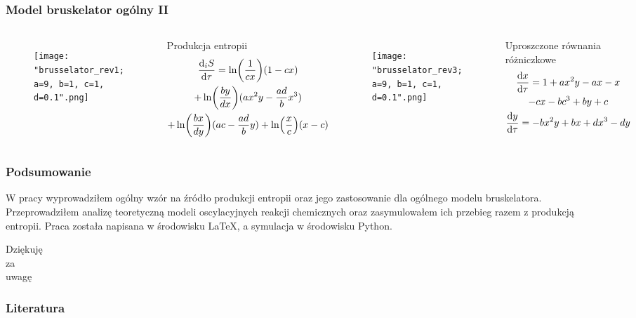 \documentclass{beamer}
\begin{document}
\begin{frame}
\frametitle{Model bruskelator ogólny II}
\begin{columns}
\begin{figure}
\texttt{[image: "brusselator\_rev1; a=9, b=1, c=1, d=0.1".png]}
\end{figure}
\begin{block}{Produkcja entropii}
\vspace*{-\baselineskip}\setlength\belowdisplayshortskip{0pt}
\footnotesize
\begin{gather*}
	\dv{_{i}S}{\tau} = \ln(\frac{1}{cx})(1 - cx) \\
	+ \ln(\frac{by}{dx})(ax^{2}y - \frac{ad}{b}x^{3}) \\
	+ \ln(\frac{bx}{dy})(ac - \frac{ad}{b}y) + \ln(\frac{x}{c})(x - c)
\end{gather*}
\normalsize
\end{block}
\begin{figure}
\texttt{[image: "brusselator\_rev3; a=9, b=1, c=1, d=0.1".png]}
\end{figure}
\begin{block}{Uproszczone równania różniczkowe}
\vspace*{-\baselineskip}\setlength\belowdisplayshortskip{0pt}
\small
\begin{gather*}
	\dv{x}{\tau} = 1 + ax^{2}y - ax - x \\
	- cx - bc^{3} + by + c \\
	\dv{y}{\tau} = -bx^{2}y + bx + dx^{3} - dy
\end{gather*}
\normalsize
\end{block}
\end{columns}
\end{frame}

\begin{frame}
\frametitle{Podsumowanie}
W pracy wyprowadziłem ogólny wzór na źródło produkcji entropii oraz jego zastosowanie dla ogólnego modelu bruskelatora. Przeprowadziłem analizę teoretyczną modeli oscylacyjnych reakcji chemicznych oraz zasymulowałem ich przebieg razem z produkcją entropii. Praca została napisana w środowisku \LaTeX, a symulacja w środowisku Python.
\end{frame}

\begin{frame}
\begin{center}
\Large
Dziękuję \\
za \\
uwagę
\end{center}
\end{frame}



\begin{frame}
\frametitle{Literatura}
\nocite{orlik, pigon1, kawczynski, palczewski, fortuna, orlik_sily_w_przyrodzie}
\tiny
\printbibliography
\end{frame}
\end{document}
